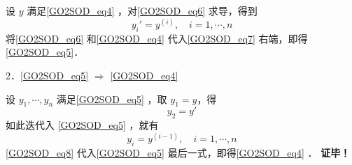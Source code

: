 设 $y$ 满足\autoref{GO2SOD_eq4} ，对\autoref{GO2SOD_eq6} 求导，得到
\begin{equation}\label{GO2SOD_eq7}
y_i'=y^{(i)},\quad i=1,\cdots,n
\end{equation}
将\autoref{GO2SOD_eq6} 和\autoref{GO2SOD_eq4} 代入\autoref{GO2SOD_eq7} 右端，即得\autoref{GO2SOD_eq5}．

2．\autoref{GO2SOD_eq5} $\Rightarrow$ \autoref{GO2SOD_eq4} 

设 $y_1,\cdots,y_n$ 满足\autoref{GO2SOD_eq5} ，取 $y_1=y$，得
\begin{equation}
y_2=y'
\end{equation}
如此迭代入 \autoref{GO2SOD_eq5} ，就有
\begin{equation}\label{GO2SOD_eq8}
y_i=y^{(i-1)},\quad i=1,\cdots,n
\end{equation}
\autoref{GO2SOD_eq8} 代入\autoref{GO2SOD_eq5} 最后一式，即得\autoref{GO2SOD_eq4} ．
\textbf{证毕！}
